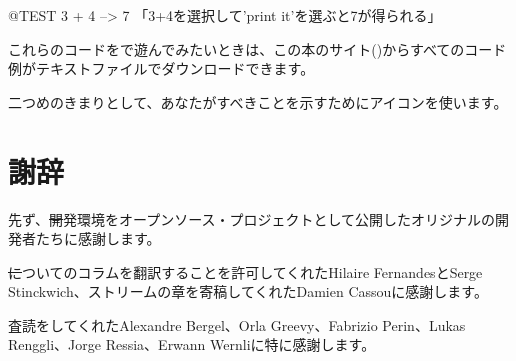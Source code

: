 \documentclass[a4paper,10pt,twoside]{book}
\begin{document}
{%
\begin{code}{@TEST}
3 + 4 --> 7    「3+4を選択して'print it'を選ぶと7が得られる」
\end{code}

これらのコードを\pharo で遊んでみたいときは、この本のサイト(\pbe)からすべてのコード例がテキストファイルでダウンロードできます。

二つめのきまりとして、あなたがすべきことを示すために\dothisicon{}アイコンを使います。


\section*{謝辞}

先ず、\st 開発環境をオープンソース・プロジェクトとして公開したオリジナルの開発者たちに感謝します。

\st についてのコラムを翻訳することを許可してくれたHilaire FernandesとSerge Stinckwich、ストリームの章を寄稿してくれたDamien Cassouに感謝します。

査読をしてくれたAlexandre Bergel、Orla Greevy、Fabrizio Perin、Lukas Renggli、Jorge Ressia、Erwann Wernliに特に感謝します。

}
\end{document}
